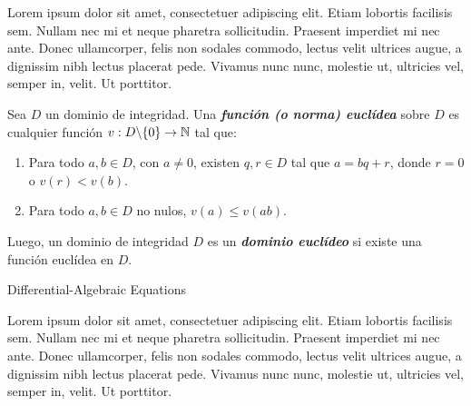 
\begin{frame}[plain]
    \begin{quag}[Introduction]
        Lorem ipsum dolor sit amet, consectetuer adipiscing elit.
        Etiam lobortis facilisis sem. Nullam nec mi et neque
        pharetra sollicitudin. Praesent imperdiet mi nec ante. Donec
        ullamcorper, felis non sodales commodo, lectus velit ultrices
        augue, a dignissim nibh lectus placerat pede. Vivamus nunc
        nunc, molestie ut, ultricies vel, semper in, velit. Ut porttitor.
    \end{quag}
\end{frame}


\begin{frame}[plain]
    \begin{bbox}[Definición]
        Sea $D$ un dominio de integridad. Una \textbf{\textit{función (o norma) euclídea}} sobre $D$ es cualquier función $v:D\backslash\{0\}\rightarrow\mathbb{N}$ tal que:
            \begin{enumerate}[1)]
                \item Para todo $a,b\in D$, con $a\neq 0$, existen $q,r\in D$ tal que $a=bq+r$, donde $r=0$ o $v(r)<v(b)$.
                \item Para todo $a,b\in D$ no nulos, $v(a)\leq v(ab)$.
            \end{enumerate}
        Luego, un dominio de integridad $D$ es un \textbf{\textit{dominio euclídeo}} si existe una función euclídea en $D$.
    \end{bbox}
\end{frame}

\begin{frame}{Differential-Algebraic Equations}
    \begin{bbox}[]
        Lorem ipsum dolor sit amet, consectetuer adipiscing elit.
        Etiam lobortis facilisis sem. Nullam nec mi et neque
        pharetra sollicitudin. Praesent imperdiet mi nec ante. Donec
        ullamcorper, felis non sodales commodo, lectus velit ultrices
        augue, a dignissim nibh lectus placerat pede. Vivamus nunc
        nunc, molestie ut, ultricies vel, semper in, velit. Ut porttitor.
    \end{bbox}
\end{frame}

